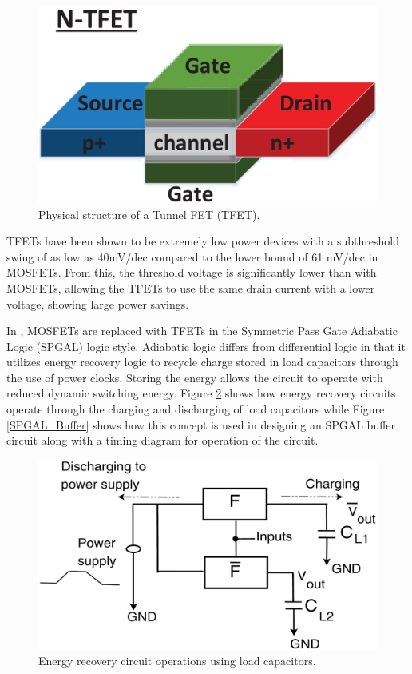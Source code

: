 \documentclass[conference, 12pt]{IEEEtran}
\newcommand{\x}{1}						%
\begin{document}
			\begin{figure}[tbp]
				\centering
				\includegraphics[width=\x\linewidth]{ReportFiles/TFET.png}
				\caption{Physical structure of a Tunnel FET (TFET).\cite{b4}}
				\label{TFET}
			\end{figure}

			TFETs have been shown to be extremely low power devices with a subthreshold swing of as low as 40mV/dec compared to the lower bound of 61 mV/dec in MOSFETs. From this, the threshold voltage is significantly lower than with MOSFETs, allowing the TFETs to use the same drain current with a lower voltage, showing large power savings.

			In \cite{b3}, MOSFETs are replaced with TFETs in the Symmetric Pass Gate Adiabatic Logic (SPGAL) logic style. Adiabatic logic differs from differential logic in that it utilizes energy recovery logic to recycle charge stored in load capacitors through the use of power clocks. Storing the energy allows the circuit to operate with reduced dynamic switching energy. Figure \ref{Energy_Recovery} shows how energy recovery circuits operate through the charging and discharging of load capacitors while Figure \ref{SPGAL_Buffer} shows how this concept is used in designing an SPGAL buffer circuit along with a timing diagram for operation of the circuit. 

			\begin{figure}[tbp]
				\centering
				\includegraphics[width=\x\linewidth]{ReportFiles/Energy_Recovery.png}
				\caption{Energy recovery circuit operations using load capacitors.\cite{b3}}
				\label{Energy_Recovery}
			\end{figure}
\end{document}

